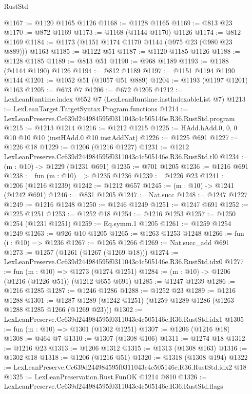 \begin{lexlean}{RustStd}
\begin{coremodule}
@1167 := @1120 @1165 @1126
@1168 := @1128 @1165
@1169 := @813 @23
@1170 := @872 @1169
@1173 := @1168 (@1144 @1170) @1126
@1174 := @812 @1169
@1184 := @1173 (@1151 @1174 @1170 @1144 (@975 @23 (@980 @23 @889))) @1163
@1185 := @1122 @51
@1187 := @1120 @1185 @1126
@1188 := @1128 @1185
@1189 := @813 @51
@1190 := @968 @1189
@1193 := @1188 (@1144 @1190) @1126
@1194 := @812 @1189
@1197 := @1151 @1194 @1190 @1144
@1201 := @1052 @51 (@1057 @51 @889)
@1204 := @1193 (@1197 @1201) @1163
@1205 := @673 @7
@1206 := @672 @1205
@1212 := LexLeanRuntime.index @652 @7 (LexLeanRuntime.instIndexableList @7)
@1213 := LexLeanTarget.TargetSyntax.Program.functions
@1214 := LexLeanPreserve.Cc639d244984595f0311043c4c505146e.R36.RustStd.program
@1215 := @1213 @1214
@1216 := @1212 @1215
@1225 := HAdd.hAdd.{0, 0, 0} @10 @10 @10 (instHAdd.{0} @10 instAddNat)
@1226 := @1225 @691
@1227 := @1226 @18
@1229 := @1206 (@1216 @1227)
@1231 := @1212 LexLeanPreserve.Cc639d244984595f0311043c4c505146e.R36.RustStd.tl0
@1234 := (m : @10) -> @1229 (@1231 @691)
@1235 := @701 @1205
@1236 := @1216 @691
@1238 := fun (m : @10) => @1235 @1236
@1239 := @1226 @23
@1241 := @1206 (@1216 @1239)
@1242 := @1212 @657
@1245 := (m : @10) -> @1241 (@1242 @691)
@1246 := @831 @1205
@1247 := Nat.succ
@1248 := @1247 @1227
@1249 := @1216 @1248
@1250 := @1246 @1249
@1251 := @1247 @691
@1252 := @1225 @1251
@1253 := @1252 @18
@1254 := @1216 @1253
@1257 := @1250 @1254 (@1231 @1251)
@1259 := Eq.symm.{1} @1205
@1261 := @1259 @1254 @1249
@1263 := @926 @10 @1205
@1265 := @1263 @1253 @1248
@1266 := fun (i : @10) => @1236
@1267 := @1265 @1266
@1269 := Nat.succ_add @691
@1273 := @1257 (@1261 (@1267 (@1269 @18)))
@1274 := LexLeanPreserve.Cc639d244984595f0311043c4c505146e.R36.RustStd.idx0
@1277 := fun (m : @10) => @1273 (@1274 @1251)
@1284 := (m : @10) -> @1206 (@1216 (@1226 @51)) (@1212 @655 @691)
@1285 := @1247 @1239
@1286 := @1216 @1285
@1287 := @1246 @1286
@1288 := @1252 @23
@1289 := @1216 @1288
@1301 := @1287 @1289 (@1242 @1251) (@1259 @1289 @1286 (@1263 @1288 @1285 @1266 (@1269 @23)))
@1302 := LexLeanPreserve.Cc639d244984595f0311043c4c505146e.R36.RustStd.idx1
@1305 := fun (m : @10) => @1301 (@1302 @1251)
@1307 := @1206 (@1216 @18)
@1308 := @464 @7
@1310 := @1307 (@1308 @106)
@1311 := @1274 @18
@1312 := @1216 @23
@1313 := @1206 @1312
@1315 := @1313 (@1308 @163)
@1316 := @1302 @18
@1318 := @1206 (@1216 @51)
@1320 := @1318 (@1308 @194)
@1322 := LexLeanPreserve.Cc639d244984595f0311043c4c505146e.R36.RustStd.idx2 @18
@1325 := LexLeanPreservation.Rust.FunOK @1214 @810
@1326 := LexLeanPreserve.Cc639d244984595f0311043c4c505146e.R36.RustStd.flags

\end{coremodule}
\end{lexlean}
